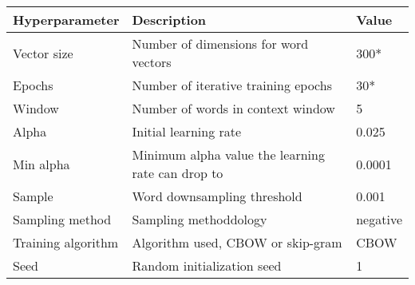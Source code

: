 \begin{tabular}{|l|p{70mm}|l|} \hline
\textbf{Hyperparameter} & \textbf{Description} & \textbf{Value} \\ \hline
Vector size & Number of dimensions for word vectors & 300* \\ \hline
Epochs & Number of iterative training epochs & 30* \\ \hline
Window & Number of words in context window & 5 \\ \hline
Alpha & Initial learning rate & 0.025 \\ \hline
Min alpha & Minimum alpha value the learning rate can drop to & 0.0001 \\ \hline
Sample & Word downsampling threshold & 0.001 \\ \hline
Sampling method & Sampling methoddology & negative \\ \hline
Training algorithm & Algorithm used, CBOW or skip-gram & CBOW \\ \hline
Seed & Random initialization seed & 1 \\ \hline
\end{tabular}